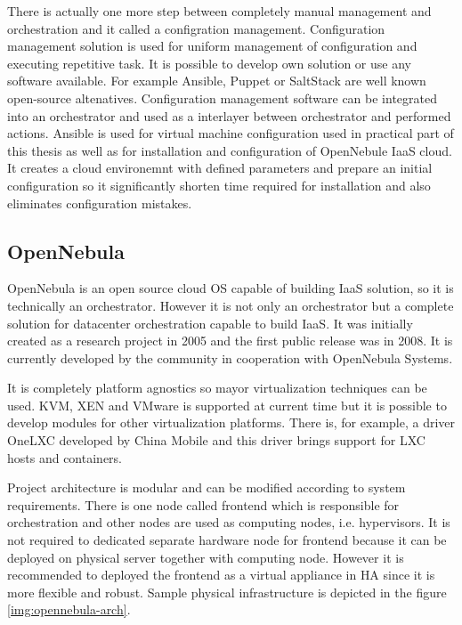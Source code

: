 There is actually one more step between completely manual management and orchestration and it called a configration management. Configuration management solution is used for uniform management of configuration and executing repetitive task. It is possible to develop own solution or use any software available. For example Ansible, Puppet or SaltStack are well known open-source altenatives. Configuration management software can be integrated into an orchestrator and used as a interlayer between orchestrator and performed actions.
Ansible is used for virtual machine configuration used in practical part of this thesis as well as for installation and configuration of OpenNebule IaaS cloud. It creates a cloud environemnt with defined parameters and prepare an initial configuration so it significantly shorten time required for installation and also eliminates configuration mistakes.  

\subsection{OpenNebula}
OpenNebula is an open source cloud OS capable of building IaaS solution, so it is technically an orchestrator. \cite{opennebula} However it is not only an orchestrator but a complete solution for datacenter orchestration capable to build \Ac{IaaS}. It was initially created as a research project in 2005 and the first public release was in 2008. It is currently developed by the community in cooperation with OpenNebula Systems.

It is completely platform agnostics so mayor virtualization techniques can be used. \Ac{KVM}, XEN and VMware is supported at current time but it is possible to develop modules for other virtualization platforms. There is, for example, a driver OneLXC developed by China Mobile and this driver brings support for \Ac{LXC} hosts and containers.

Project architecture is modular and can be modified according to system requirements. There is one node called frontend which is responsible for orchestration and other nodes are used as computing nodes, i.e. hypervisors. It is not required to dedicated separate hardware node for frontend because it can be deployed on physical server together with computing node. However it is recommended to deployed the frontend as a virtual appliance in \Ac{HA} since it is more flexible and robust. Sample physical infrastructure is depicted in the figure \ref{img:opennebula-arch}.


